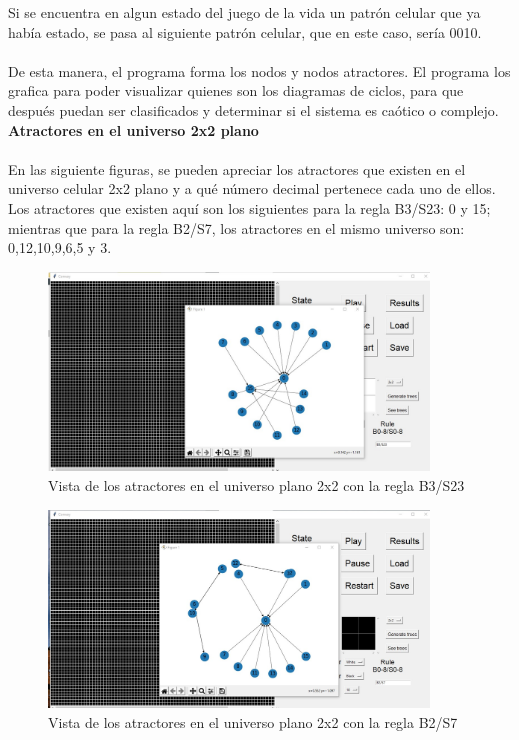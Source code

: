 \documentclass[12pt,a4paper]{book}
\begin{document}
Si se encuentra en algun estado del juego de la vida un patrón celular que ya había estado, se pasa al siguiente patrón celular, que en este caso, sería 0010.\\\\
De esta manera, el programa forma los nodos y nodos atractores. El programa los grafica para poder visualizar quienes son los diagramas de ciclos, para que después puedan ser clasificados y determinar si el sistema es caótico o complejo.
\clearpage
	\textbf{Atractores en el universo 2x2 plano}
	\\\\
	En las siguiente figuras, se pueden apreciar los atractores que existen en el universo celular 2x2 plano y a qué número decimal pertenece cada uno de ellos. Los atractores que existen aquí son los siguientes para la regla B3/S23: 0 y 15; mientras que para la regla B2/S7, los atractores en el mismo universo son: 0,12,10,9,6,5 y 3.
\begin{figure}[H]
	\centering
	\includegraphics[width=0.9\textwidth]{imagen13PC}
	\caption{Vista de los atractores en el universo plano 2x2 con la regla B3/S23}
\end{figure}
\begin{figure}[H]
	\centering
	\includegraphics[width=0.9\textwidth]{imagen14PC}
	\caption{Vista de los atractores en el universo plano 2x2 con la regla B2/S7}
\end{figure} 
\end{document}
